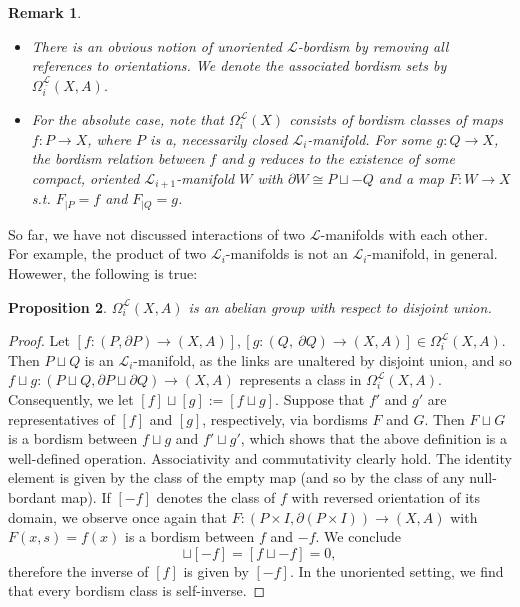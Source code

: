\documentclass{scrreprt}
\newtheorem{prop}{Proposition}[chapter]
\newtheorem{remark}[prop]{Remark}
\begin{document}
\begin{remark}
\begin{itemize}
\item[1.] There is an obvious notion of unoriented $\mathcal{L}$-bordism by removing all references to orientations. We denote the associated bordism sets by $\Omega_i^{\underline{\mathcal{L}}}(X,A)$.
\item[2.] For the absolute case, note that $\Omega_i^{\mathcal{L}}(X)$ consists of bordism classes of maps \\ $f: P \to X$, where $P$ is a, necessarily closed $\mathcal{L}_i$-manifold. For some $g: Q \to X$, the bordism relation between $f$ and $g$ reduces to the existence of some compact, oriented $\mathcal{L}_{i+1}$-manifold $W$ with $\partial W \cong P \sqcup -Q$ and a map $F: W \to X$ s.t. $F_{|P}=f$ and $F_{|Q}=g$.
\end{itemize}
\end{remark}

So far, we have not discussed interactions of two $\mathcal{L}$-manifolds with each other. For example, the product of two $\mathcal{L}_i$-manifolds is not an $\mathcal{L}_i$-manifold, in general. Howewer, the following is true:

\begin{prop}
$\Omega_i^{\mathcal{L}}(X,A)$ is an abelian group with respect to disjoint union.
\end{prop}

\begin{proof}
Let $[f: (P, \partial P) \to (X,A)], [g: (Q,\ \partial Q) \to (X,A)] \in \Omega_i^{\mathcal{L}}(X,A)$. Then $P \sqcup Q$ is an $\mathcal{L}_i$-manifold, as the links are unaltered by disjoint union, and so $f \sqcup g: (P \sqcup Q, \partial P \sqcup \partial Q) \to (X,A)$ represents a class in $\Omega_i^{\mathcal{L}}(X,A)$. Consequently, we let $[f] \sqcup [g]:= [f \sqcup g]$. Suppose that $f'$ and $g'$ are representatives of $[f]$ and $[g]$, respectively, via bordisms $F$ and $G$. Then $F \sqcup G$ is a bordism between $f \sqcup g$ and $f' \sqcup g'$, which shows that the above definition is a well-defined operation. Associativity and commutativity clearly hold. The identity element is given by the class of the empty map (and so by the class of any null-bordant map). If $[-f]$ denotes the class of $f$ with reversed orientation of its domain, we observe once again that $F: (P \times I, \partial(P \times I)) \to (X,A)$ with $F(x,s)=f(x)$ is a bordism between $f$ and $-f$. We conclude
\begin{equation*}
[f] \sqcup [-f] = [f \sqcup -f] = 0 ,
\end{equation*}
therefore the inverse of $[f]$ is given by $[-f]$. In the unoriented setting, we find that every bordism class is self-inverse.
\end{proof}
\end{document}
